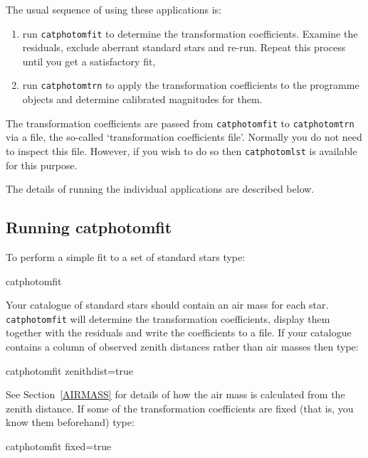 \documentclass[twoside,11pt]{starlink}
\begin{document}
The usual sequence of using these applications is:

\begin{enumerate}

  \item run \texttt{catphotomfit} to determine the transformation
   coefficients.  Examine the residuals, exclude aberrant standard
   stars and re-run.  Repeat this process until you get a satisfactory
   fit,

  \item run \texttt{catphotomtrn} to apply the transformation coefficients
   to the programme objects and determine calibrated magnitudes for
   them.

\end{enumerate}

The transformation coefficients are passed from \texttt{catphotomfit} to
\texttt{catphotomtrn} via a file, the so-called `transformation
coefficients file'.  Normally you do not need to inspect this file.
However, if you wish to do so then \texttt{catphotomlst} is available
for this purpose.

The details of running the individual applications are described below.

\subsection{Running catphotomfit}

To perform a simple fit to a set of standard stars type:

\begin{terminalv}
catphotomfit
\end{terminalv}

Your catalogue of standard stars should contain an air mass for each
star.  \texttt{catphotomfit} will determine the transformation coefficients,
display them together with the residuals and write the coefficients
to a file.  If your catalogue contains a column of observed zenith
distances rather than air masses then type:

\begin{terminalv}
catphotomfit  zenithdist=true
\end{terminalv}

See Section~\ref{AIRMASS} for details of how the air mass is calculated
from the zenith distance.  If some of the transformation coefficients
are fixed (that is, you know them beforehand) type:

\begin{terminalv}
catphotomfit  fixed=true
\end{terminalv}
\end{document}
